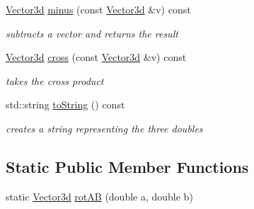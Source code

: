 \begin{DoxyCompactItemize}
\hyperlink{classCPlantBox_1_1Vector3d}{Vector3d} \hyperlink{classCPlantBox_1_1Vector3d_ae08a1e4755769d5a935d2f01ea7cdce1}{minus} (const \hyperlink{classCPlantBox_1_1Vector3d}{Vector3d} \&v) const
\begin{DoxyCompactList}\small\item\em subtracts a vector and returns the result \end{DoxyCompactList}\item 
\mbox{\label{classCPlantBox_1_1Vector3d_a162cd6480a13184ff2b7ff8582f23f93}} 
\hyperlink{classCPlantBox_1_1Vector3d}{Vector3d} \hyperlink{classCPlantBox_1_1Vector3d_a162cd6480a13184ff2b7ff8582f23f93}{cross} (const \hyperlink{classCPlantBox_1_1Vector3d}{Vector3d} \&v) const
\begin{DoxyCompactList}\small\item\em takes the cross product \end{DoxyCompactList}\item 
\mbox{\label{classCPlantBox_1_1Vector3d_a13fe672dcf28f795980d8f46036b303f}} 
std\+::string \hyperlink{classCPlantBox_1_1Vector3d_a13fe672dcf28f795980d8f46036b303f}{to\+String} () const
\begin{DoxyCompactList}\small\item\em creates a string representing the three doubles \end{DoxyCompactList}\end{DoxyCompactItemize}
\subsection*{Static Public Member Functions}
\begin{DoxyCompactItemize}
\item 
static \hyperlink{classCPlantBox_1_1Vector3d}{Vector3d} \hyperlink{classCPlantBox_1_1Vector3d_abecea9fab84647e0dafabaf667d99c5b}{rot\+AB} (double a, double b)
\end{DoxyCompactItemize}
